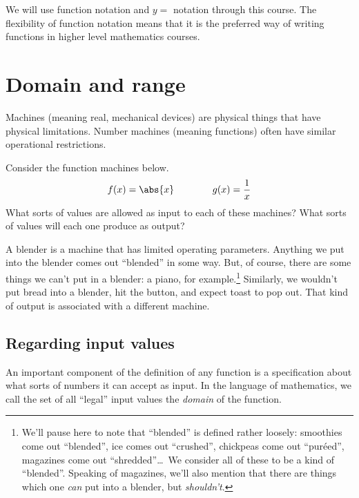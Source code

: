 We will use function notation and $y =$ notation through this course. The flexibility of function notation means that it is the preferred way of writing functions in higher level mathematics courses.


\section{Domain and range}


Machines (meaning real, mechanical devices) are physical things that have physical limitations. Number machines (meaning functions) often have similar operational restrictions.

\begin{boxedexplore}
Consider the function machines below.
\[f(x) = \abs{x} \qquad\qquad g(x)=\frac{1}{x}\]
What sorts of values are allowed as input to each of these machines? What sorts of values will each one produce as output?
\end{boxedexplore} %

A blender is a machine that has limited operating parameters. Anything we put into the blender comes out ``blended'' in some way. But, of course, there are some things we can't put in a blender: a piano, for example.\footnote{We'll pause here to note that ``blended'' is defined rather loosely: smoothies come out ``blended'', ice comes out ``crushed'', chickpeas come out ``pur\'eed'', magazines come out ``shredded''\ldots\ We consider all of these to be a kind of ``blended''. Speaking of magazines, we'll also mention that there are things which one \textit{can} put into a blender, but \textit{shouldn't}.} Similarly, we wouldn't put bread into a  blender, hit the button, and expect toast to pop out. That kind of output is associated with a different machine.

\subsection{Regarding input values}

An important component of the definition of any function is a specification about what sorts of numbers it can accept as input. In the language of mathematics, we call the set of all ``legal'' input values the \textit{domain} of the function.

